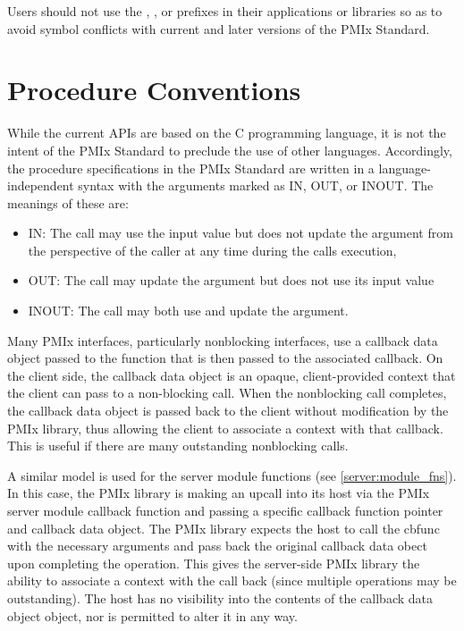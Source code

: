 Users should not use the \textbf{}, \textbf{}, or \textbf{} prefixes in their applications or libraries so as to avoid symbol conflicts with current and later versions of the \ac{PMIx} Standard.

\section{Procedure Conventions}

While the current \acp{API} are based on the C programming language, it is not the intent of the \ac{PMIx} Standard to preclude the use of other languages.
Accordingly, the procedure specifications in the \ac{PMIx} Standard are written in a language-independent syntax with the arguments marked as IN, OUT, or INOUT.
The meanings of these are:
\begin{itemize}
\item IN:
The call may use the input value but does not update the argument from the perspective of the caller at any time during the calls execution,
\item OUT:
The call may update the argument but does not use its input value
\item INOUT:
The call may both use and update the argument.
\end{itemize}

Many \ac{PMIx} interfaces, particularly nonblocking interfaces, use a  callback data object passed to the function that is then passed to the associated callback. On the client side, the callback data object is an opaque, client-provided context that the client can pass to a non-blocking call. When the nonblocking call completes, the callback data object is passed back to the client without modification by the \ac{PMIx} library, thus allowing the client to associate a context with that callback. This is useful if there are many outstanding nonblocking calls.

A similar model is used for the server module functions (see \ref{server:module_fns}). In this case, the \ac{PMIx} library is making an upcall into its host via the \ac{PMIx} server module callback function and passing a specific callback function pointer and callback data object. The \ac{PMIx} library expects the host to call the cbfunc with the necessary arguments and pass back the original callback data obect upon completing the operation. This gives the server-side \ac{PMIx} library the ability to associate a context with the call back (since multiple operations may be outstanding). The host has no visibility into the contents of the callback data object object, nor is permitted to alter it in any way.
